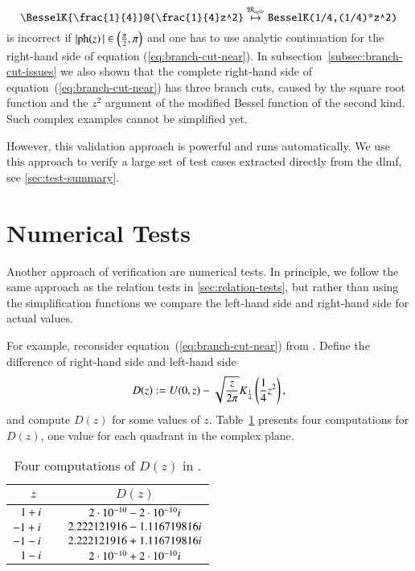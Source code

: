 \begin{equation}
\verb|\BesselK{\frac{1}{4}}@{\frac{1}{4}z^2}| \overset{\langMaple}{\mapsto} \verb|BesselK(1/4,(1/4)*z^2)|
\end{equation}
is incorrect if $|\mathrm{ph}\!\left(z\right)| \in \left(\frac{{\pi}}{2}, {\pi}\right)$ and one has to use analytic continuation for the right-hand side of equation (\ref{eq:branch-cut-near}). In subsection~\ref{subsec:branch-cut-issues} we also shown that the complete right-hand side of equation~(\ref{eq:branch-cut-near}) has three branch cuts, caused by the square root function and the $z^2$ argument of the modified Bessel function of the second kind. Such complex examples cannot be simplified yet.

However, this validation approach is powerful and runs automatically. We use this approach to verify a large set of test cases extracted directly from the \gls{dlmf}, see \cref{sec:test-summary}.

\section{Numerical Tests}\label{sec:numerical-tests}
Another approach of verification are numerical tests. In principle, we follow the same approach as the relation tests in \cref{sec:relation-tests}, but rather than using the simplification functions we compare the left-hand side and right-hand side for actual values. 

For example, reconsider equation~(\ref{eq:branch-cut-near}) from \parencite[(12.7.10)]{NIST:DLMF}. Define the difference of right-hand side and left-hand side
\begin{equation}\label{eq:difference}
D(z) := U(0,z) - \sqrt{\frac{z}{2{\pi}}} K_{\frac{1}{4}}\left(\frac{1}{4}z^2\right),
\end{equation}
and compute $D(z)$ for some values of $z$. Table~\ref{tab:computations-for-difference} presents four computations for $D(z)$, one value for each quadrant in the complex plane.
\begin{table}[ht]
\centering
\begin{tabular}{rcc}
	\hline
	$z\ \ $ & & $D(z)$\\
	\hline
	\tableRowSpace{} $1+{i}$ & & $2 \cdot 10^{-10} - 2 \cdot 10^{-10} {i}$\\
	$-1+{i}$& & $2.222121916 - 1.116719816 {i}$\\
	$-1-{i}$& & $2.222121916 + 1.116719816 {i}$\\
	$1-{i}$ & & $2 \cdot 10^{-10} + 2 \cdot 10^{-10} {i}$\\
	\hline
\end{tabular}
\caption{Four computations of $D(z)$ in \Maple.}
\label{tab:computations-for-difference}
\end{table}

